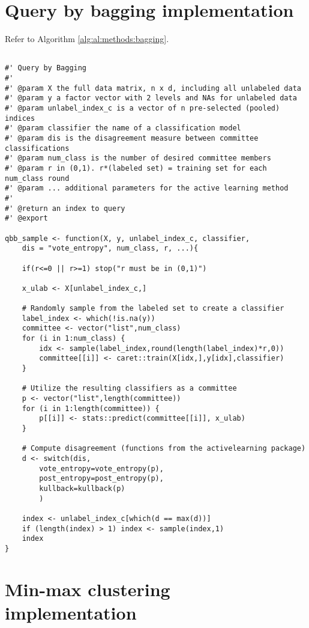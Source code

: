 \section{Query by bagging implementation}
\label{sec:appendicies:al:bagging}

Refer to Algorithm \ref{alg:al:methods:bagging}. 
{
\begin{lstlisting}

#' Query by Bagging
#'
#' @param X the full data matrix, n x d, including all unlabeled data
#' @param y a factor vector with 2 levels and NAs for unlabeled data
#' @param unlabel_index_c is a vector of n pre-selected (pooled) indices
#' @param classifier the name of a classification model
#' @param dis is the disagreement measure between committee classifications
#' @param num_class is the number of desired committee members
#' @param r in (0,1). r*(labeled set) = training set for each num_class round
#' @param ... additional parameters for the active learning method
#'
#' @return an index to query
#' @export

qbb_sample <- function(X, y, unlabel_index_c, classifier, 
	dis = "vote_entropy", num_class, r, ...){

	if(r<=0 || r>=1) stop("r must be in (0,1)")
	
	x_ulab <- X[unlabel_index_c,]
	
	# Randomly sample from the labeled set to create a classifier
	label_index <- which(!is.na(y))
	committee <- vector("list",num_class)
	for (i in 1:num_class) {
		idx <- sample(label_index,round(length(label_index)*r,0))
		committee[[i]] <- caret::train(X[idx,],y[idx],classifier)
	}
	
	# Utilize the resulting classifiers as a committee
	p <- vector("list",length(committee))
	for (i in 1:length(committee)) {
		p[[i]] <- stats::predict(committee[[i]], x_ulab)
	}
	
	# Compute disagreement (functions from the activelearning package)
	d <- switch(dis,
		vote_entropy=vote_entropy(p),
		post_entropy=post_entropy(p),
		kullback=kullback(p)
		)
	
	index <- unlabel_index_c[which(d == max(d))]
	if (length(index) > 1) index <- sample(index,1)
	index
}
\end{lstlisting}
}

\section{Min-max clustering implementation}
\label{sec:appendicies:al:clustering}

